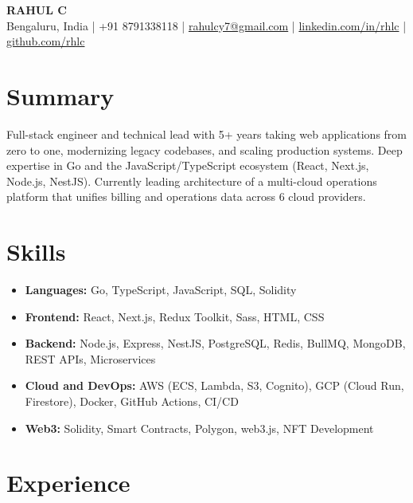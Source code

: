 \documentclass[11pt, a4paper]{article}
\begin{document}
\begin{center}
    {\LARGE\bfseries RAHUL C}\\[4pt]
    Bengaluru, India | +91 8791338118 | \href{mailto:rahulcy7@gmail.com}{rahulcy7@gmail.com} | \href{https://linkedin.com/in/rhlc}{linkedin.com/in/rhlc} | \href{https://github.com/rhlc}{github.com/rhlc}
\end{center}

\section*{Summary}
Full-stack engineer and technical lead with 5+ years taking web applications from zero to one, modernizing legacy codebases, and scaling production systems. Deep expertise in Go and the JavaScript/TypeScript ecosystem (React, Next.js, Node.js, NestJS). Currently leading architecture of a multi-cloud operations platform that unifies billing and operations data across 6 cloud providers.

\section*{Skills}
\begin{itemize}[itemsep=1pt]
    \item[] \textbf{Languages:} Go, TypeScript, JavaScript, SQL, Solidity
    \item[] \textbf{Frontend:} React, Next.js, Redux Toolkit, Sass, HTML, CSS
    \item[] \textbf{Backend:} Node.js, Express, NestJS, PostgreSQL, Redis, BullMQ, MongoDB, REST APIs, Microservices
    \item[] \textbf{Cloud and DevOps:} AWS (ECS, Lambda, S3, Cognito), GCP (Cloud Run, Firestore), Docker, GitHub Actions, CI/CD
    \item[] \textbf{Web3:} Solidity, Smart Contracts, Polygon, web3.js, NFT Development
\end{itemize}

\section*{Experience}
\end{document}
